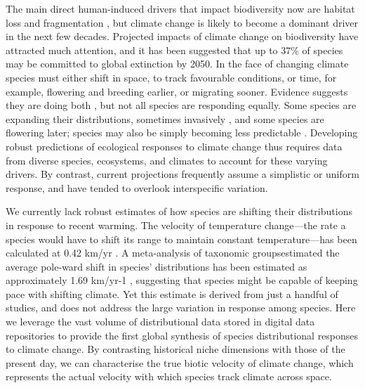 \documentclass[12pt]{report}
\begin{document}
The main direct human-induced drivers that impact biodiversity now are
habitat loss \supercite{Newbold2015} and fragmentation
\supercite{Haddad2015}, but climate change is likely to become a
dominant driver in the next few
decades\supercite{Parmesan2003,Thuiller2007,Urban2015}. Projected
impacts of climate change on biodiversity have attracted much
attention, and it has been suggested that up to 37\% of species may be
committed to global extinction by 2050\supercite{Thomas2004}. In the
face of changing climate species must either shift in space, to track
favourable conditions, or time, for example, flowering and breeding
earlier, or migrating sooner. Evidence suggests they are doing both
\supercite{Parmesan2003,Parmesan2006,Menzel2006,Chen2011}, but not all
species are responding equally. Some species are expanding their
distributions, sometimes invasively \supercite{Hellmann2008}, and some
species are flowering later\supercite{Cook2012}; species may also be
simply becoming less predictable \supercite{Pearse2017phenology}.
Developing robust predictions of ecological responses to climate
change thus requires data from diverse species, ecosystems, and
climates to account for these varying drivers. By contrast, current
projections frequently assume a simplistic or uniform response, and
have tended to overlook interspecific variation.

We currently lack robust estimates of how species are shifting their
distributions in response to recent warming. The velocity of
temperature change---the rate a species would have to shift its range
to maintain constant temperature---has been calculated at 0.42 km/yr
\supercite{Loarie2009}. A meta-analysis of taxonomic groupsestimated
the average pole-ward shift in species' distributions has been
estimated as approximately 1.69 km/yr-1 \supercite{Chen2011},
suggesting that species might be capable of keeping pace with shifting
climate. Yet this estimate is derived from just a handful of studies,
and does not address the large variation in response among species.
Here we leverage the vast volume of distributional data stored in
digital data repositories\supercite{url_gbif} to provide the first
global synthesis of species distributional responses to climate
change. By contrasting historical niche dimensions with those of the
present day, we can characterise the true biotic velocity of climate
change, which represents the actual velocity with which species track
climate across space.
\end{document}

